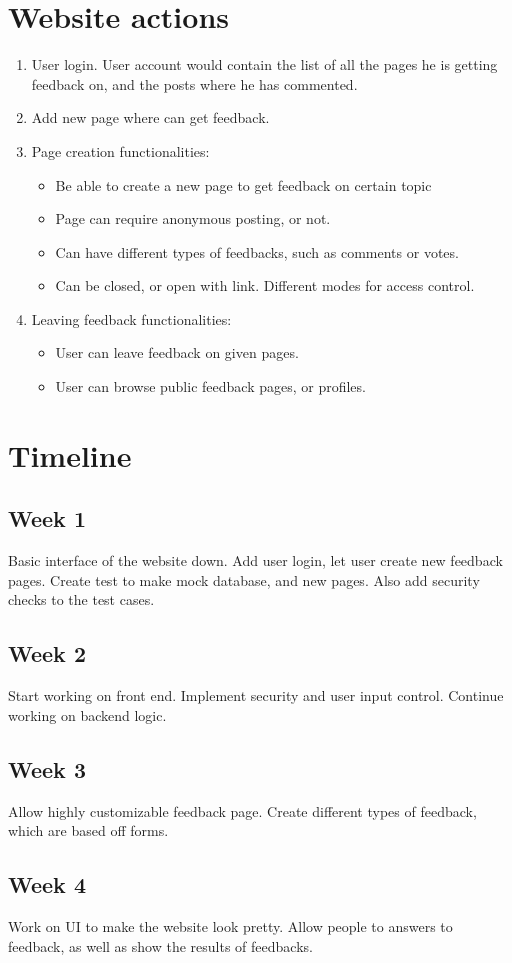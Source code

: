 \documentclass[a4paper]{article}
\begin{document}
\section{Website actions} %
\label{sec:Technical Specificatio}
\begin{enumerate}
  \item User login. User account would contain the list of all the pages he is getting feedback on, and the posts where he has commented.
  \item Add new page where can get feedback.
  \item Page creation functionalities:
    \begin{itemize}
      \item Be able to create a new page to get feedback on certain topic 
      \item Page can require anonymous posting, or not.
      \item Can have different types of feedbacks, such as comments or votes.
      \item Can be closed, or open with link. Different modes for access control.
    \end{itemize}
  \item Leaving feedback functionalities:
    \begin{itemize}
      \item User can leave feedback on given pages.
      \item User can browse public feedback pages, or profiles.
    \end{itemize}
\end{enumerate}
\section{Timeline} %
\label{sec:Timeline}
\subsection{Week 1} %
\label{sub:Week 1}
Basic interface of the website down. Add user login, let user create new feedback pages. Create test to make mock database, and new pages. Also add security checks to the test cases.
\subsection{Week 2} %
\label{sub:Week 2}
Start working on front end. Implement security and user input control. Continue working on backend logic.
\subsection{Week 3} %
\label{sub:Week 3}
Allow highly customizable feedback page. Create different types of feedback, which are based off forms.
\subsection{Week 4} %
\label{sub:Week 4}
Work on UI to make the website look pretty. Allow people to answers to feedback, as well as show the results of feedbacks.
\end{document}
